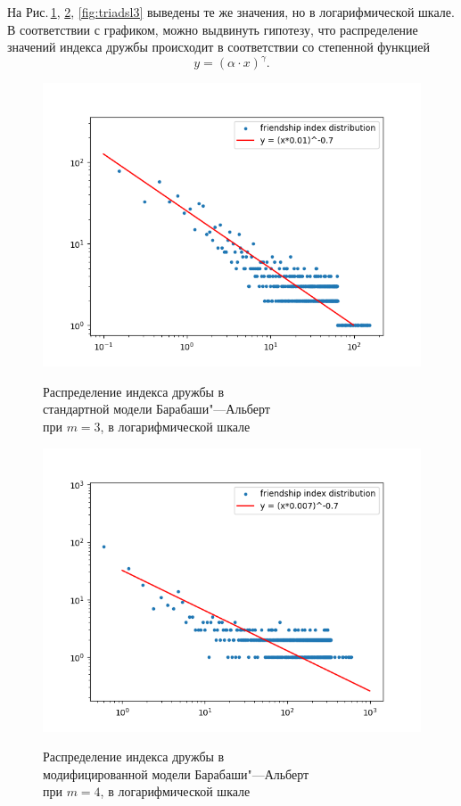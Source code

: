 \documentclass[bachelor, och, diploma]{SCWorks}
\begin{document}
На Рис.\,\ref{fig:basl3}, \ref{fig:bapsl3}, \ref{fig:triadsl3} выведены те же значения, но в логарифмической шкале. В соответствии с графиком, можно выдвинуть гипотезу, что распределение значений индекса дружбы происходит в соответствии со степенной функцией
\[
y = (\alpha \cdot x)^\gamma.
\]
\begin{figure}[!ht]
\centering
\includegraphics[scale=0.7]{diploma_results/static_log/ba_dist_beta_3.png}\\
\caption{Распределение индекса дружбы  в\\ стандартной модели Барабаши"---Альберт\\ при $m=3$, в логарифмической шкале}\label{fig:basl3}
\end{figure}
\begin{figure}[!ht]
\centering
\includegraphics[scale=0.7]{diploma_results/static_log/bap_dist_beta_4.png}\\
\caption{Распределение индекса дружбы  в\\ модифицированной модели Барабаши"---Альберт\\ при $m=4$, в логарифмической шкале}\label{fig:bapsl3}
\end{figure}
\end{document}
